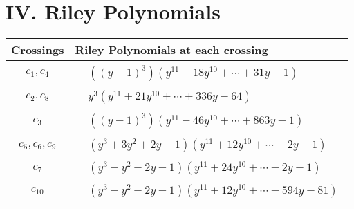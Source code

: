 \documentclass[1p]{elsarticle_modified}
\theoremstyle{definition}
\begin{document}
\centering \section*{ IV. Riley Polynomials}
\begin{tabular}{m{50pt}|m{274pt}}
Crossings & \hspace{64pt}Riley Polynomials at each crossing \\
\hline $$\begin{aligned}c_{1},c_{4}\end{aligned}$$&$\begin{aligned}
&((y-1)^3)(y^{11}-18 y^{10}+\cdots+31 y-1)
\end{aligned}$\\
\hline $$\begin{aligned}c_{2},c_{8}\end{aligned}$$&$\begin{aligned}
&y^3(y^{11}+21 y^{10}+\cdots+336 y-64)
\end{aligned}$\\
\hline $$\begin{aligned}c_{3}\end{aligned}$$&$\begin{aligned}
&((y-1)^3)(y^{11}-46 y^{10}+\cdots+863 y-1)
\end{aligned}$\\
\hline $$\begin{aligned}c_{5},c_{6},c_{9}\end{aligned}$$&$\begin{aligned}
&(y^3+3 y^2+2 y-1)(y^{11}+12 y^{10}+\cdots-2 y-1)
\end{aligned}$\\
\hline $$\begin{aligned}c_{7}\end{aligned}$$&$\begin{aligned}
&(y^3- y^2+2 y-1)(y^{11}+24 y^{10}+\cdots-2 y-1)
\end{aligned}$\\
\hline $$\begin{aligned}c_{10}\end{aligned}$$&$\begin{aligned}
&(y^3- y^2+2 y-1)(y^{11}+12 y^{10}+\cdots-594 y-81)
\end{aligned}$\\
\hline
\end{tabular}
\vskip 2pc
\end{document}
